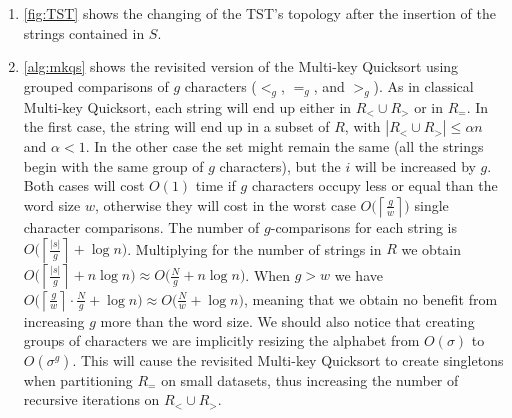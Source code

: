 \begin{enumerate}

  \item \autoref{fig:TST} shows the changing of the TST's topology after the
  insertion of the strings contained in $S$.

  \item \autoref{alg:mkqs} shows the revisited version of the Multi-key
  Quicksort using grouped comparisons of $g$ characters ($<_g$, $=_g$, and
  $>_g$). As in classical Multi-key Quicksort, each string will end up either in
  $R_< \cup R_>$ or in $R_=$. In the first case, the string will end up in a
  subset of $R$, with $|R_< \cup R_>| \le \alpha n$ and $\alpha < 1$. In the
  other case the set might remain the same (all the strings begin with the same
  group of $g$ characters), but the $i$ will be increased by $g$. Both cases
  will cost $O(1)$ time if $g$ characters occupy less or equal than the word
  size $w$, otherwise they will cost in the worst case $O\big(\left\lceil
  \frac{g}{w} \right\rceil \big)$ single character comparisons. The number of
  $g$-comparisons for each string is $O\Big(\left\lceil \frac{|s|}{g}
  \right\rceil + \log n \Big)$. Multiplying for the number of strings in $R$ we
  obtain $O\Big(\left\lceil \frac{|s|}{g} \right\rceil + n\log n \Big) \approx
  O\big(\frac{N}{g} + n\log n \big)$. When $g > w$ we have $O\big(\left\lceil
  \frac{g}{w} \right\rceil \cdot \frac{N}{g} + \log n \big) \approx
  O\big(\frac{N}{w} + \log n \big)$, meaning that we obtain no benefit from
  increasing $g$ more than the word size. We should also notice that creating
  groups of characters we are implicitly resizing the alphabet from $O(\sigma)$
  to $O(\sigma^g)$. This will cause the revisited Multi-key Quicksort to create
  singletons when partitioning $R_=$ on small datasets, thus increasing the
  number of recursive iterations on $R_< \cup R_>$.

\end{enumerate}
%
